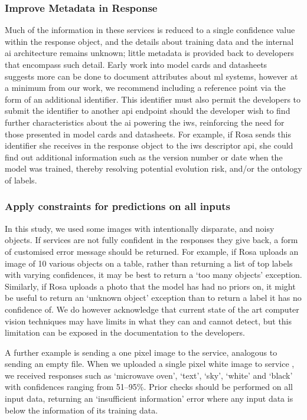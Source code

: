 \subsubsection{Improve Metadata in Response}
Much of the information in these services is reduced to a single confidence value within the response object, and the details about training data and the internal \gls{ai} architecture remains unknown; little metadata is provided back to developers that encompass such detail. Early work into model cards and datasheets~\citep{Mitchell:2018in,Gebru:2018wh} suggests more can be done to document attributes about \gls{ml} systems, however at a minimum from our work, we recommend including a reference point via the form of an additional identifier. This identifier must also permit the developers to submit the identifier to another \gls{api} endpoint should the developer wish to find further characteristics about the \gls{ai} powering the \gls{iws}, reinforcing the need for those presented in model cards and datasheets. For example, if Rosa sends this identifier she receives in the response object to the \gls{iws} descriptor \gls{api}, she could find out additional information such as the version number or date when the model was trained, thereby resolving potential evolution risk, and/or the ontology of labels.
 
\subsubsection{Apply constraints for predictions on all inputs}
In this study, we used some images with intentionally disparate, and noisy objects. If services are not fully confident in the responses they  give back, a form of customised error message should be returned. For example, if Rosa uploads an image of 10 various objects on a table, rather than returning a list of top labels with varying confidences, it may be best to return a `too many objects' exception. Similarly, if Rosa uploads a photo that the model has had no priors on, it might be useful to return an `unknown object' exception than to return a label it has no confidence of. We do however acknowledge that current state of the art computer vision techniques may have limits in what they can and cannot detect, but this limitation can be exposed in the documentation to the developers.

A further example is sending a one pixel image to the service, analogous to sending an empty file. When we uploaded a single pixel white image to service \googleapi{}, we received responses such as `microwave oven', `text', `sky', `white' and `black' with confidences ranging from 51--95\%. Prior checks should be performed on all input data, returning an `insufficient information' error where any input data is below the information of its training data.
 
